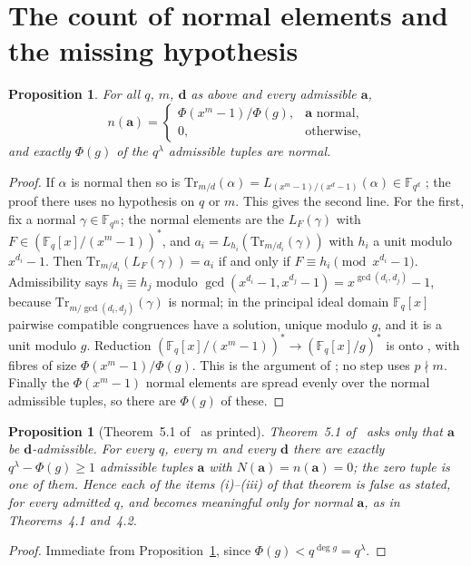\documentclass[11pt,a4paper]{amsart}
\newtheorem{proposition}[theorem]{Proposition}
\theoremstyle{remark}
\newcommand{\F}{\mathbb{F}}
\newcommand{\Fq}{\mathbb{F}_q}
\newcommand{\Tr}{\mathrm{Tr}}
\newcommand{\bd}{\mathbf{d}}
\newcommand{\ba}{\mathbf{a}}
\newcommand{\MKB}{\cite{MKB}}
\begin{document}
\section{The count of normal elements and the missing hypothesis}

\begin{proposition}\label{prop:count}
For all $q$, $m$, $\bd$ as above and every admissible $\ba$,
\[
n(\ba)=\begin{cases}\Phi(x^m-1)/\Phi(g),&\ba\text{ normal},\\ 0,&\text{otherwise,}\end{cases}
\]
and exactly $\Phi(g)$ of the $q^{\lambda}$ admissible tuples are normal.
\end{proposition}
\begin{proof}
If $\alpha$ is normal then so is $\Tr_{m/d}(\alpha)=L_{(x^m-1)/(x^d-1)}(\alpha)\in\F_{q^d}$ \cite[Lemma~3.1]{MKB};
the proof there uses no hypothesis on $q$ or $m$. This gives the second line. For the first, fix a normal
$\gamma\in\F_{q^m}$; the normal elements are the $L_F(\gamma)$ with $F\in(\Fq[x]/(x^m-1))^*$, and
$a_i=L_{h_i}(\Tr_{m/d_i}(\gamma))$ with $h_i$ a unit modulo $x^{d_i}-1$. Then $\Tr_{m/d_i}(L_F(\gamma))=a_i$
if and only if $F\equiv h_i\pmod{x^{d_i}-1}$. Admissibility says $h_i\equiv h_j$ modulo
$\gcd(x^{d_i}-1,x^{d_j}-1)=x^{\gcd(d_i,d_j)}-1$, because $\Tr_{m/\gcd(d_i,d_j)}(\gamma)$ is normal; in the
principal ideal domain $\Fq[x]$ pairwise compatible congruences have a solution, unique modulo $g$, and it is
a unit modulo $g$. Reduction $(\Fq[x]/(x^m-1))^*\to(\Fq[x]/g)^*$ is onto \cite[Lemma~3.3]{MKB}, with fibres of size
$\Phi(x^m-1)/\Phi(g)$. This is the argument of \cite[Theorem~3.6]{MKB}; no step uses $p\nmid m$. Finally the
$\Phi(x^m-1)$ normal elements are spread evenly over the normal admissible tuples, so there are $\Phi(g)$ of
these.
\end{proof}

\begin{proposition}[Theorem~5.1 of \MKB\ as printed]\label{prop:nonnormal}
Theorem~5.1 of \MKB\ asks only that $\ba$ be $\bd$-admissible. For every $q$, every $m$ and every $\bd$ there
are exactly $q^{\lambda}-\Phi(g)\ge1$ admissible tuples $\ba$ with $N(\ba)=n(\ba)=0$; the zero tuple is one of
them. Hence each of the items \textup{(i)--(iii)} of that theorem is false as stated, for every admitted
$q$, and becomes meaningful only for normal $\ba$, as in Theorems~4.1 and~4.2.
\end{proposition}
\begin{proof}
Immediate from Proposition~\ref{prop:count}, since $\Phi(g)<q^{\deg g}=q^{\lambda}$.
\end{proof}
\end{document}
